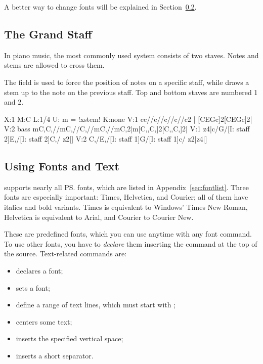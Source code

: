 \documentclass[a4paper,12pt]{book}
\begin{document}

A better way to change fonts will be explained in
Section~\ref{sec:usingfonts}.


\subsection{The Grand Staff}
\label{sec:grandstaff}

In piano music, the most commonly used system consists of two staves.
Notes and stems are allowed to cross them.

The  field is used to force the position of
notes on a specific staff, while  draws a stem up to the
note on the previous staff. Top and bottom staves are numbered 1 and
2.

\begin{abcsource}
X:1
M:C
L:1/4
U: m = !xstem!
K:none
V:1
cc//c//c//c//c2 | [CEGc]2[CEGc]2|
V:2 bass
mC,C,//mC,//C,//mC,//mC,2|m[C,,C,]2[C,,C,]2|
V:1
z4|c/G/[I: staff 2]E,/[I: staff 2]C,/ z2|]
V:2
C,/E,/[I: staff 1]G/[I: staff 1]c/ z2|z4|]
\end{abcsource}



\subsection{Using Fonts and Text}
\label{sec:usingfonts}

\abcm{} supports nearly all \ps{} fonts, which are listed in
Appendix~\ref{sec:fontlist}. Three fonts are especially important:
Times, Helvetica, and Courier; all of them have italics and bold
variants. Times is equivalent to Windows' Times New Roman, Helvetica
is equivalent to Arial, and Courier to Courier New.

These are predefined fonts, which you can use anytime with any font
command. To use other fonts, you have to \emph{declare} them inserting
the  command at the top of the source. Text-related
commands are:

\begin{itemize}
  
  \item {} declares a font;
  
  \item {} sets a font;
  
  \item {} define a range of
  text lines, which must start with \metacmd{};
  
  \item {} centers some text;
  
  \item {} inserts the specified vertical space;
  
  \item {} inserts a short separator.

\end{itemize}
\end{document}
